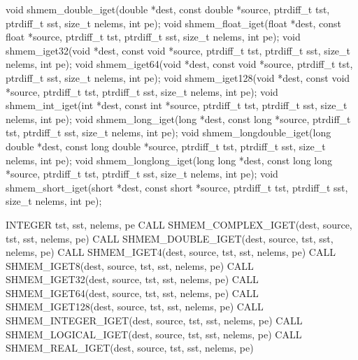 \label{subsec:shmem_iget}
\synC   %

void shmem_double_iget(double *dest, const double *source, ptrdiff_t tst, ptrdiff_t sst, size_t nelems, int pe);
void shmem_float_iget(float *dest, const float *source, ptrdiff_t tst, ptrdiff_t sst, size_t nelems, int pe);
void shmem_iget32(void *dest, const void *source, ptrdiff_t tst, ptrdiff_t sst, size_t nelems, int pe);
void shmem_iget64(void *dest, const void *source, ptrdiff_t tst, ptrdiff_t sst, size_t nelems, int pe);
void shmem_iget128(void *dest, const void *source, ptrdiff_t  tst, ptrdiff_t sst, size_t nelems, int pe);
void shmem_int_iget(int *dest, const int *source, ptrdiff_t tst, ptrdiff_t sst, size_t nelems, int pe);
void shmem_long_iget(long *dest, const  long  *source,  ptrdiff_t tst, ptrdiff_t sst, size_t nelems, int pe);
void shmem_longdouble_iget(long double *dest, const long double *source, ptrdiff_t tst, ptrdiff_t sst, size_t nelems, int pe);
void shmem_longlong_iget(long long *dest, const long long *source, ptrdiff_t tst, ptrdiff_t sst, size_t nelems, int pe);
void shmem_short_iget(short *dest, const short *source, ptrdiff_t tst, ptrdiff_t sst, size_t nelems, int pe); %
\synF   %

INTEGER tst, sst, nelems, pe
CALL SHMEM_COMPLEX_IGET(dest, source, tst, sst, nelems, pe)
CALL SHMEM_DOUBLE_IGET(dest, source, tst, sst, nelems, pe)
CALL SHMEM_IGET4(dest, source, tst, sst, nelems, pe)
CALL SHMEM_IGET8(dest, source, tst, sst, nelems, pe)
CALL SHMEM_IGET32(dest, source, tst, sst, nelems, pe)
CALL SHMEM_IGET64(dest, source, tst, sst, nelems, pe)
CALL SHMEM_IGET128(dest, source, tst, sst, nelems, pe)
CALL SHMEM_INTEGER_IGET(dest, source, tst, sst, nelems, pe)
CALL SHMEM_LOGICAL_IGET(dest, source, tst, sst, nelems, pe)
CALL SHMEM_REAL_IGET(dest, source, tst, sst, nelems, pe) %


